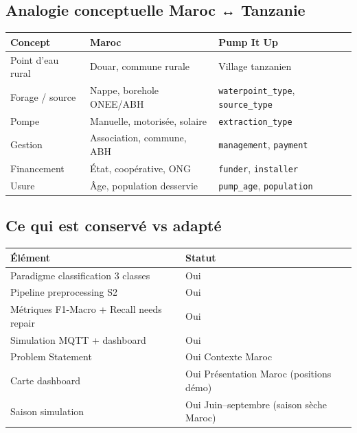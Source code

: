 \documentclass[11pt,a4paper]{report}
\begin{document}
\subsection{Analogie conceptuelle Maroc ↔ Tanzanie}

{\small
\begin{longtable}{@{}>{\raggedright\arraybackslash}p{}>{\raggedright\arraybackslash}p{}>{\raggedright\arraybackslash}p{}@{}}
\toprule
\rowcolor{EHTPTableHead}Concept & Maroc & Pump It Up \\
\midrule
Point d'eau rural & Douar, commune rurale & Village tanzanien \\
Forage / source & Nappe, borehole ONEE/ABH & \texttt{waterpoint\_type}, \texttt{source\_type} \\
Pompe & Manuelle, motorisée, solaire & \texttt{extraction\_type} \\
Gestion & Association, commune, ABH & \texttt{management}, \texttt{payment} \\
Financement & État, coopérative, ONG & \texttt{funder}, \texttt{installer} \\
Usure & Âge, population desservie & \texttt{pump\_age}, \texttt{population} \\
\bottomrule
\end{longtable}
}

\subsection{Ce qui est conservé vs adapté}

{\small
\begin{longtable}{@{}>{\raggedright\arraybackslash}p{}>{\raggedright\arraybackslash}p{}@{}}
\toprule
\rowcolor{EHTPTableHead}Élément & Statut \\
\midrule
Paradigme classification 3 classes & Oui \\
Pipeline preprocessing S2 & Oui \\
Métriques F1-Macro + Recall needs repair & Oui \\
Simulation MQTT + dashboard & Oui \\
Problem Statement & Oui Contexte Maroc \\
Carte dashboard & Oui Présentation Maroc (positions démo) \\
Saison simulation & Oui Juin–septembre (saison sèche Maroc) \\
\bottomrule
\end{longtable}
}
\end{document}

